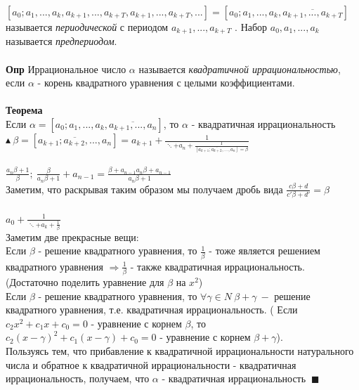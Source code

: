 $[a_0; a_1, . . . , a_k, a_{k+1}, . . . , a_{k+T} , a_{k+1}, . . . , a_{k+T} , . . .] = [a_0; a_1, . . . , a_k, \overline{a_{k+1}, . . . , a_{k+T}}]$ называется \textit{периодической} с периодом $a_{k+1}, . . . , a_{k+T}$ . Набор $a_0, a_1, . . . , a_k$ называется \textit{предпериодом}.
\\
\\
\textbf{Опр} Иррациональное число $\alpha$ называется \textit{квадратичной иррациональностью}, если $\alpha$ - корень квадратного уравнения с целыми коэффициентами.
\\
\\
\textbf{Теорема}\\
Если $\alpha = [a_0; a_1, . . . , a_k, \overline{a_{k+1}, . . . , a_{n}}]$, то $\alpha$ - квадратичная иррациональность
\\
$\blacktriangle \ \beta = [\overline{a_{k+1}; a_{k+2}, ...,  a_n}] = a_{k+1} + \frac{1}{\ddots + a_n + \frac{1}{[\overline{a_{k+1}; a_{k+2}, ...,  a_n}] = \beta}}$
\\
\\
$\frac{a_n\beta + 1}{\beta}; \ \frac{\beta}{a_n \beta + 1} + a_{n-1} = \frac{\beta + a_{n-1}a_n\beta + a_{n-1}}{a_n\beta + 1}$\\
Заметим, что раскрывая таким образом мы получаем дробь вида $\frac{c\beta + d}{c'\beta + d'} = \beta$
\\
\\
$a_{0} + \frac{1}{\ddots + a_k + \frac{1}{\beta}}$
\\
Заметим две прекрасные вещи: \\
Если $\beta$ - решение квадратного уравнения, то $\frac{1}{\beta}$ - тоже является решением квадратного уравнения $\Longrightarrow \frac{1}{\beta}$ -  также квадратичная иррациональность. (Достаточно поделить уравнение для $\beta$ на $x^2$)
\\
Если $\beta$ - решение квадратного уравнения, то $\forall \gamma \in N \ \beta + \gamma \ -$ решение квадратного уравнения, т.е. квадратичная иррациональность. ( Если $c_2x^2 + c_1 x + c_0 = 0$ -  уравнение с корнем $\beta$, то $c_2(x - \gamma)^2 + c_1 (x - \gamma) + c_0 = 0$ - уравнение с корнем $\beta + \gamma$).
\\
Пользуясь тем, что прибавление к квадратичной иррациональности натурального числа и обратное к квадратичной иррациональности - квадратичная иррациональность, получаем, что $\alpha$ - квадратичная иррациональность $\ \blacksquare$

